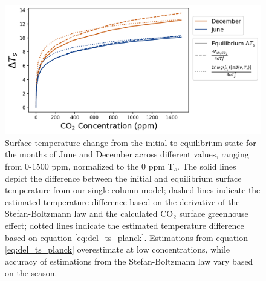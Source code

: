 \documentclass[draft]{agujournal2019}
\begin{document}
\begin{figure}[htb!]
\noindent\includegraphics[width=1\textwidth]{delta_Ts.png}
\centering
\caption{Surface temperature change from the initial to equilibrium state for the months of June and December across different  values, ranging from 0-1500 ppm, normalized to the 0 ppm T$_s$. The solid lines depict the difference between the initial and equilibrium surface temperature from our single column model; dashed lines indicate the estimated temperature difference based on the derivative of the Stefan-Boltzmann law and the calculated CO$_2$ surface greenhouse effect; dotted lines indicate the estimated temperature difference based on equation \ref{eq:del_ts_planck}. Estimations from equation \ref{eq:del_ts_planck} overestimate at low  concentrations, while accuracy of estimations from the Stefan-Boltzmann law vary based on the season.}
\label{fig:delta_ts}
\end{figure}


\end{document}
